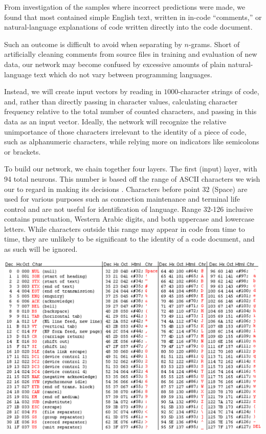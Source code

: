 \documentclass{article}
\begin{document}
From investigation of the samples where incorrect predictions were made, we found that most contained simple English text, written in in-code ``comments,'' or natural-language explanations of code written directly into the code document.

Such an outcome is difficult to avoid when separating by $n$-grams. Short of artificially cleaning comments from source files in training and evaluation of new data, our network may become confused by excessive amounts of plain natural-language text which do not vary between programming languages.

Instead, we will create input vectors by reading in $1000$-character strings of code, and, rather than directly passing in character values, calculating character frequency relative to the total number of counted characters, and passing in this data as an input vector. Ideally, the network will recognize the relative unimportance of those characters irrelevant to the identity of a piece of code, such as alphanumeric characters, while relying more on indicators like semicolons or brackets.

To build our network, we chain together four layers. The first (input) layer, with 94 total neurons. This number is based off the range of ASCII characters we wish our to regard in making its decisions \cite{asciitable}. Characters before point 32 (Space) are used for various purposes such as connection maintenance and terminal life control and are not useful for identification of language. Range 32-126 inclusive contains punctuation, Western Arabic digits, and both uppercase and lowercase letters. While characters outside this range may appear in code from time to time, they are unlikely to be significant to the identity of a code document, and as such will be ignored.

\includegraphics{asciitable}
\end{document}
